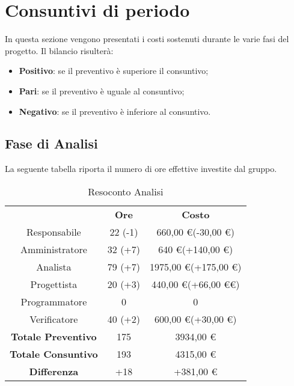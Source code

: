 \section{Consuntivi di periodo}
In questa sezione vengono presentati i costi sostenuti durante le varie fasi del progetto.
Il bilancio risulterà:
    \begin{itemize}
        \item \textbf{Positivo}: se il preventivo è superiore il consuntivo;
        \item \textbf{Pari}: se il preventivo è uguale al consuntivo;
        \item \textbf{Negativo}: se il preventivo è inferiore al consuntivo.
    \end{itemize}

    \subsection{Fase di Analisi}
    La seguente tabella riporta il numero di ore effettive investite dal gruppo.
        \begin{table}[H]                
            \centering
            \renewcommand{\arraystretch}{2.8}
            \begin{tabular}{c c c}
                \rowcolor[HTML]{232f3e} 
                \multicolumn{1}{c}{\color[HTML]{FFFFFF} \textbf{Ruolo}} &
                \multicolumn{1}{c}{\color[HTML]{FFFFFF} \textbf{Ore}} &
                \multicolumn{1}{c}{\color[HTML]{FFFFFF} \textbf{Costo}} \\
                Responsabile&22 (-1)&660,00 \euro (-30,00 \euro)\\ 
                Amministratore&32 (+7)&640 \euro (+140,00 \euro)\\
                Analista&79 (+7)&1975,00 \euro (+175,00 \euro)\\
                Progettista&20 (+3)&440,00 \euro (+66,00 \euro \euro)\\
                Programmatore&0&0\\
                Verificatore&40 (+2)&600,00 \euro (+30,00 \euro)\\
                \textbf{Totale Preventivo}&175&3934,00 \euro\\
                \textbf{Totale Consuntivo}&193&4315,00 \euro\\
                \textbf{Differenza}&+18&+381,00 \euro\\
            \end{tabular}
            \caption {Resoconto Analisi} \label{table:resoconto analisi}
        \end{table}

